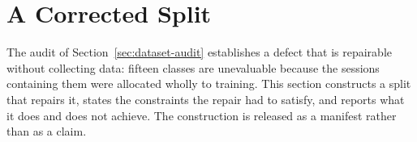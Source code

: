 \section{A Corrected Split}
\label{sec:corrected-split}

%
%

The audit of Section~\ref{sec:dataset-audit} establishes a defect that is
repairable without collecting data: fifteen classes are unevaluable because the
sessions containing them were allocated wholly to training. This section
constructs a split that repairs it, states the constraints the repair had to
satisfy, and reports what it does and does not achieve. The construction is
released as a manifest rather than as a claim.


